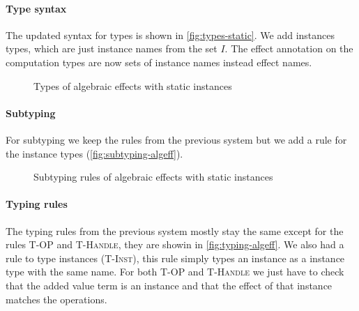 {\paragraph{Type syntax}
The updated syntax for types is shown in \cref{fig:types-static}.
We add instances types, which are just instance names from the set $I$.
The effect annotation on the computation types are now sets of instance names instead effect names.

\begin{figure}
\caption{Types of algebraic effects with static instances}
\centering
{}
\end{figure}

\paragraph{Subtyping}
For subtyping we keep the rules from the previous system but we add a rule for the instance types (\cref{fig:subtyping-algeff}).

\begin{figure}
\caption{Subtyping rules of algebraic effects with static instances}
\centering
{}
\end{figure}

\paragraph{Typing rules}
The typing rules from the previous system mostly stay the same except for the rules \textsc{T-OP} and \textsc{T-Handle}, they are showin in \cref{fig:typing-algeff}.
We also had a rule to type instances (\textsc{T-Inst}), this rule simply types an instance as a instance type with the same name.
For both \textsc{T-OP} and \textsc{T-Handle} we just have to check that the added value term is an instance and that the effect of that instance matches the operations.

}
